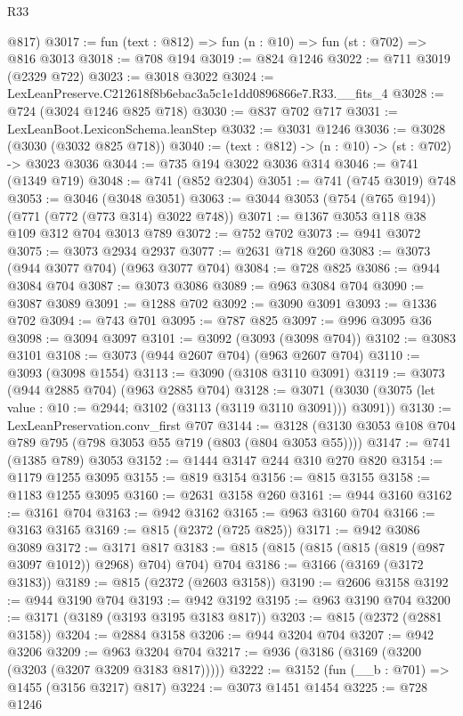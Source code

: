 \begin{lexlean}{R33}
\begin{coremodule}
      @817)
@3017 := fun (text : @812) => fun (n : @10) => fun (st : @702) => @816 @3013
@3018 := @708 @194
@3019 := @824 @1246
@3022 := @711 @3019 (@2329 @722)
@3023 := @3018 @3022
@3024 := LexLeanPreserve.C212618f8b6ebac3a5c1e1dd0896866e7.R33.__fits_4
@3028 := @724 (@3024 @1246 @825 @718)
@3030 := @837 @702 @717
@3031 := LexLeanBoot.LexiconSchema.leanStep
@3032 := @3031 @1246
@3036 := @3028 (@3030 (@3032 @825 @718))
@3040 := (text : @812) -> (n : @10) -> (st : @702) -> @3023 @3036
@3044 := @735 @194 @3022 @3036 @314
@3046 := @741 (@1349 @719)
@3048 := @741 (@852 @2304)
@3051 := @741 (@745 @3019) @748
@3053 := @3046 (@3048 @3051)
@3063 := @3044 @3053 (@754 (@765 @194)) (@771 (@772 (@773 @314) @3022 @748))
@3071 := @1367 @3053 @118 @38 @109 @312 @704 @3013 @789
@3072 := @752 @702
@3073 := @941 @3072
@3075 := @3073 @2934 @2937
@3077 := @2631 @718 @260
@3083 := @3073 (@944 @3077 @704) (@963 @3077 @704)
@3084 := @728 @825
@3086 := @944 @3084 @704
@3087 := @3073 @3086
@3089 := @963 @3084 @704
@3090 := @3087 @3089
@3091 := @1288 @702
@3092 := @3090 @3091
@3093 := @1336 @702
@3094 := @743 @701
@3095 := @787 @825
@3097 := @996 @3095 @36
@3098 := @3094 @3097
@3101 := @3092 (@3093 (@3098 @704))
@3102 := @3083 @3101
@3108 := @3073 (@944 @2607 @704) (@963 @2607 @704)
@3110 := @3093 (@3098 @1554)
@3113 := @3090 (@3108 @3110 @3091)
@3119 := @3073 (@944 @2885 @704) (@963 @2885 @704)
@3128 := @3071 (@3030 (@3075 (let value : @10 := @2944; @3102 (@3113 (@3119 @3110 @3091))) @3091))
@3130 := LexLeanPreservation.conv_first @707
@3144 := @3128 (@3130 @3053 @108 @704 @789 @795 (@798 @3053 @55 @719 (@803 (@804 @3053 @55))))
@3147 := @741 (@1385 @789) @3053
@3152 := @1444 @3147 @244 @310 @270 @820
@3154 := @1179 @1255 @3095
@3155 := @819 @3154
@3156 := @815 @3155
@3158 := @1183 @1255 @3095
@3160 := @2631 @3158 @260
@3161 := @944 @3160
@3162 := @3161 @704
@3163 := @942 @3162
@3165 := @963 @3160 @704
@3166 := @3163 @3165
@3169 := @815 (@2372 (@725 @825))
@3171 := @942 @3086 @3089
@3172 := @3171 @817
@3183 := @815 (@815 (@815 (@815 (@819 (@987 @3097 @1012)) @2968) @704) @704) @704
@3186 := @3166 (@3169 (@3172 @3183))
@3189 := @815 (@2372 (@2603 @3158))
@3190 := @2606 @3158
@3192 := @944 @3190 @704
@3193 := @942 @3192
@3195 := @963 @3190 @704
@3200 := @3171 (@3189 (@3193 @3195 @3183 @817))
@3203 := @815 (@2372 (@2881 @3158))
@3204 := @2884 @3158
@3206 := @944 @3204 @704
@3207 := @942 @3206
@3209 := @963 @3204 @704
@3217 := @936 (@3186 (@3169 (@3200 (@3203 (@3207 @3209 @3183 @817)))))
@3222 := @3152 (fun (__b : @701) => @1455 (@3156 @3217) @817)
@3224 := @3073 @1451 @1454
@3225 := @728 @1246

\end{coremodule}
\end{lexlean}
